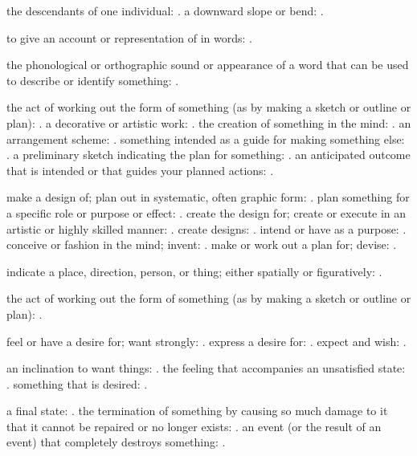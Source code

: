   the descendants of one individual: . a downward slope or bend: .

  to give an account or representation of in words: .

  the phonological or orthographic sound or appearance of a word that can be used to describe or identify something: .

  the act of working out the form of something (as by making a sketch or outline or plan): . a decorative or artistic work: . the creation of something in the mind: . an arrangement scheme: . something intended as a guide for making something else: . a preliminary sketch indicating the plan for something: . an anticipated outcome that is intended or that guides your planned actions: .

  make a design of; plan out in systematic, often graphic form: . plan something for a specific role or purpose or effect: . create the design for; create or execute in an artistic or highly skilled manner: . create designs: . intend or have as a purpose: . conceive or fashion in the mind; invent: . make or work out a plan for; devise: .

  indicate a place, direction, person, or thing; either spatially or figuratively: .

  the act of working out the form of something (as by making a sketch or outline or plan): .

  feel or have a desire for; want strongly: . express a desire for: . expect and wish: .

  an inclination to want things: . the feeling that accompanies an unsatisfied state: . something that is desired: .

  a final state: . the termination of something by causing so much damage to it that it cannot be repaired or no longer exists: . an event (or the result of an event) that completely destroys something: .

